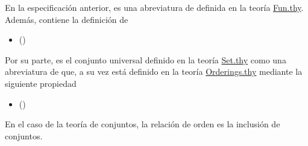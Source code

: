 \begin{isabellebody}
%
\begin{isamarkuptext}%
En la especificación anterior,  es una 
  abreviatura de  definida en la teoría
  \href{http://bit.ly/2XuPQx5}{Fun.thy}. Además, contiene la definición
  de 
  \begin{itemize}
    \item[]  \hfill ()
  \end{itemize} 
  Por su parte,  es el conjunto universal definido en la 
  teoría \href{http://bit.ly/2XtHCW6}{Set.thy} como una abreviatura de 
   que, a su vez está definido en la teoría 
  \href{http://bit.ly/2Xyj9Pe}{Orderings.thy} mediante la siguiente
  propiedad 
  \begin{itemize}
    \item[]  
      \hfill ()
  \end{itemize} 
  En el caso de la teoría de conjuntos, la relación de orden es la
  inclusión de conjuntos.


\end{isamarkuptext}
\end{isabellebody}
